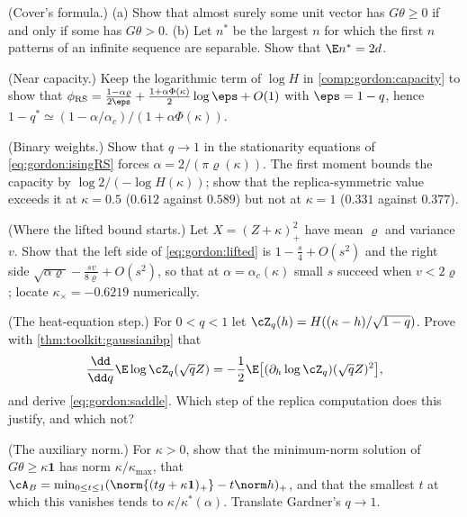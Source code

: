 \begin{refsection}
\begin{exercises}
\item \consolidation (Cover's formula.) (a) Show that almost surely some unit vector has $G\theta\ge0$ if and only if some has $G\theta>0$.  (b) Let $n^*$ be the largest $n$ for which the first $n$ patterns of an infinite sequence are separable. Show that $\E n^*=2d$. \label{ex:gordon:cover}

\item \byhand (Near capacity.) Keep the logarithmic term of $\log H$ in \cref{comp:gordon:capacity} to show that $\phi_{\mathrm{RS}}=\frac{1-\alpha\varrho}{2\eps}+\frac{1+\alpha\Phi(\kappa)}2\log\eps+O(1)$ with $\eps=1-q$, hence $1-q^*\simeq(1-\alpha/\alpha_c)/(1+\alpha\Phi(\kappa))$.\label{ex:gordon:near}

\item \byhand (Binary weights.) Show that $q\to1$ in the stationarity equations of \eqref{eq:gordon:isingRS} forces $\alpha=2/(\pi\varrho(\kappa))$. The first moment bounds the capacity by $\log2/(-\log H(\kappa))$; show that the replica-symmetric value exceeds it at $\kappa=0.5$ ($0.612$ against $0.589$) but not at $\kappa=1$ ($0.331$ against $0.377$).\label{ex:gordon:ising}

\item \byhand\hard (Where the lifted bound starts.) Let $X=(Z+\kappa)_+^2$ have mean $\varrho$ and variance $v$. Show that the left side of \eqref{eq:gordon:lifted} is $1-\frac s4+O(s^2)$ and the right side $\sqrt{\alpha\varrho}-\frac{sv}{8\varrho}+O(s^2)$, so that at $\alpha=\alpha_c(\kappa)$ small $s$ succeed when $v<2\varrho$; locate $\kappa_\times=-0.6219$ numerically. \label{ex:gordon:lifted}

\item \translate (The heat-equation step.) For $0<q<1$ let $\cZ_q(h)=H((\kappa-h)/\sqrt{1-q})$. Prove with \cref{thm:toolkit:gaussianibp} that
\[
\frac{\dd}{\dd q}\E\log\cZ_q(\sqrt qZ)=-\frac12\E\bigl[(\partial_h\log\cZ_q)(\sqrt qZ)^2\bigr],
\]
and derive \eqref{eq:gordon:saddle}. Which step of the replica computation does this justify, and which not?\label{ex:gordon:heat}

\item \translate (The auxiliary norm.) For $\kappa>0$, show that the minimum-norm solution of $G\theta\ge\kappa\mathbf 1$ has norm $\kappa/\kappa_{\max}$, that $\cA_B=\min_{0\le t\le1}(\norm{(tg+\kappa\mathbf 1)_+}-t\norm h)_+$, and that the smallest $t$ at which this vanishes tends to $\kappa/\kappa^*(\alpha)$. Translate Gardner's $q\to1$.\label{ex:gordon:norm}


\end{exercises}
\end{refsection}
